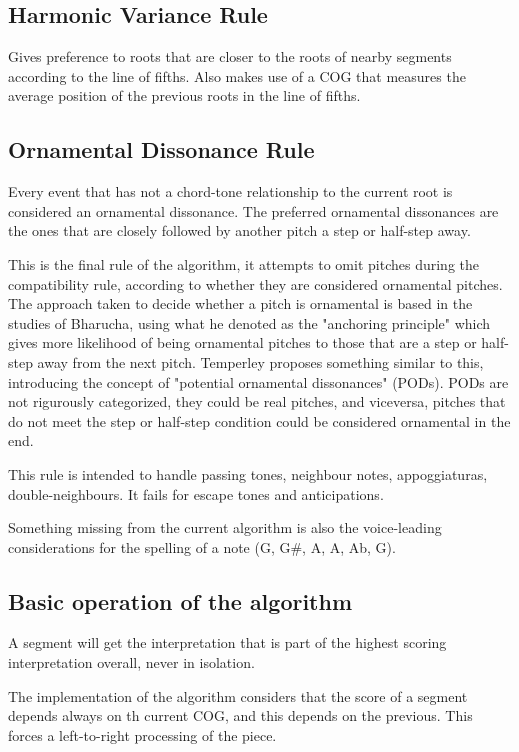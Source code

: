   \subsection{Harmonic Variance Rule}
  Gives preference to roots that are closer to the roots of nearby segments according to the line of fifths. Also makes use of a COG that measures the average position of the previous roots in the line of fifths.

  \subsection{Ornamental Dissonance Rule}
  Every event that has not a chord-tone relationship to the current root is considered an ornamental dissonance. The preferred ornamental dissonances are the ones that are closely followed by another pitch a step or half-step away.

  This is the final rule of the algorithm, it attempts to omit pitches during the compatibility rule, according to whether they are considered ornamental pitches. The approach taken to decide whether a pitch is ornamental is based in the studies of Bharucha, using what he denoted as the "anchoring principle" which gives more likelihood of being ornamental pitches to those that are a step or half-step away from the next pitch. Temperley proposes something similar to this, introducing the concept of "potential ornamental dissonances" (PODs). PODs are not rigurously categorized, they could be real pitches, and viceversa, pitches that do not meet the step or half-step condition could be considered ornamental in the end.

  This rule is intended to handle passing tones, neighbour notes, appoggiaturas, double-neighbours. It fails for escape tones and anticipations.

  Something missing from the current algorithm is also the voice-leading considerations for the spelling of a note (G, G\#, A, A, Ab, G).

  \subsection{Basic operation of the algorithm}
  A segment will get the interpretation that is part of the highest scoring interpretation overall, never in isolation.

  The implementation of the algorithm considers that the score of a segment depends always on th current COG, and this depends on the previous. This forces a left-to-right processing of the piece.

